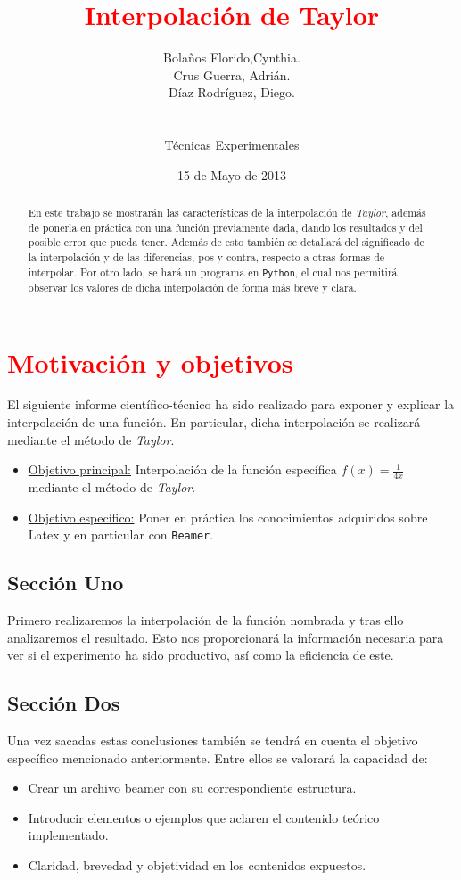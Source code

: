 \documentclass[a4paper,12pt]{article}
\begin{document}
\pagecolor[gray]{0.9}

\title {\textcolor{red}{Interpolación de Taylor}}
\author{Bolaños Florido,Cynthia. \\
Crus Guerra, Adrián.\\
Díaz Rodríguez, Diego.\\ 
\\
\\Técnicas Experimentales}
\date{15 de Mayo de 2013}
\maketitle
 \newpage
\begin{abstract}
 En este trabajo se mostrarán las características de la interpolación de {\em Taylor}, 
 además de ponerla en práctica con una función previamente dada, dando los resultados y del posible error que pueda tener.
 Además de esto también se detallará del significado de la interpolación y de las diferencias, pos y contra, 
 respecto a otras formas de interpolar. 
 Por otro lado, se hará un programa en {\tt Python}, el cual nos permitirá observar los valores de dicha interpolación de forma más breve y clara.
 \end{abstract}
  \newpage
\tableofcontents
  \newpage
 \section{\textcolor{red}{Motivación y objetivos}}
 El siguiente informe científico-técnico ha sido realizado para exponer y explicar la interpolación de una función. En particular,
 dicha interpolación se realizará mediante el método de {\em Taylor}.
 \begin{itemize}
  \item \underline{Objetivo principal:} Interpolación  de la función específica $f(x)=\frac{1}{4x}$ mediante el método de {\em Taylor}.
  \item  \underline{Objetivo específico:} Poner en práctica los conocimientos adquiridos sobre Latex y en particular con {\tt Beamer}.
 \end{itemize}
\subsection{Sección Uno}
Primero realizaremos la interpolación de la función nombrada y tras ello analizaremos el resultado.
Esto nos proporcionará la información necesaria para ver si el experimento ha sido productivo, así como la eficiencia de este.
\subsection{Sección Dos}
Una vez sacadas estas conclusiones también se tendrá en cuenta el objetivo específico mencionado anteriormente. 
Entre ellos se valorará la capacidad de:
 \begin{itemize}
  \item   Crear un archivo beamer con su correspondiente estructura.
  \item   Introducir elementos o ejemplos que aclaren el contenido teórico implementado.
  \item   Claridad, brevedad y objetividad en los contenidos expuestos.
 \end{itemize}
\newpage
\end{document}
